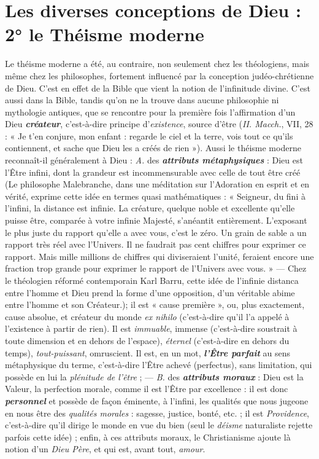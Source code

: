 \section{Les diverses conceptions de Dieu : 2° le Théisme
moderne}%
Le théisme moderne a été, au contraire, non seulement
chez les théologiens, mais même chez les philosophes, fortement
influencé par la {\it }conception judéo-chrétienne de Dieu. C’est en effet
de la Bible que vient la notion de l’\textbf{\textit {}}infinitude divine. C’est aussi
dans la Bible, tandis qu’on ne la trouve dans aucune philosophie ni
mythologie antiques, que se rencontre pour la première fois l’affirmation
d’un Dieu \textbf{\textit {créateur}}, c’est-à-dire principe d’{\it existence}, source
d’être ({\it II. Macch.}, VII, 28 : « Je t’en conjure, mon enfant : regarde
le ciel et la terre, vois tout ce qu’ils contiennent, et sache que Dieu
les a créés de rien »). Aussi le théisme moderne reconnaît-il généralement
à Dieu : {\it A.} des \textbf{\textit {attributs métaphysiques}} : Dieu est l’Être
infini, dont la grandeur est incommensurable avec celle de tout être
créé
{\footnotesize (Le philosophe Malebranche, dans une méditation sur l’Adoration en esprit et en
vérité, exprime cette idée en termes quasi mathématiques : « Seigneur, du fini à l'infini,
la distance est infinie. La créature, quelque noble et excellente qu'elle puisse être, comparée
à votre infinie Majesté, s'anéantit entièrement. L’exposant le plus juste du rapport
qu'elle a avec vous, c’est le zéro. Un grain de sable a un rapport très réel avec l'Univers.
Il ne faudrait pas cent chiffres pour exprimer ce rapport. Mais mille millions de chiffres
qui diviseraient l'unité, feraient encore une fraction trop grande pour exprimer le rapport
de l'Univers avec vous. » — Chez le théologien réformé contemporain Karl Barru,
cette idée de l'infinie distanca entre l’homme et Dieu prend la forme d’une opposition,
d'un véritable abime entre l’homme et son Créateur.)};
il est « cause première », ou, plus exactement, cause absolue,
et créateur du monde {\it ex nihilo} (c’est-à-dire qu’il l’a appelé à l’existence
à partir de rien). Il est {\it immuable}, immense (c’est-à-dire soustrait
à toute dimension et en dehors de l’espace), {\it éternel} (c’est-à-dire
en dehors du temps), {\it tout-puissant}, omruscient. Il est, en un mot,
\textbf{\textit {l'Être parfait}} au sens métaphysique du terme, c’est-à-dire l'Être
achevé (perfectus), sans limitation, qui possède en lui la {\it plénitude
de l'être} ; — {\it B.} des \textbf{\textit {attributs moraux}} : Dieu est {\it }la Valeur, la {\it }perfection
morale, comme il est l’Être par excellence : il est donc \textbf{\textit {personnel}}
et possède de façon éminente, à l’infini, les qualités que nous jugeone
en nous être des {\it qualités morales} : sagesse, justice, bonté, etc. ; il est
{\it Providence}, c’est-à-dire qu’il dirige le monde en vue du bien (seul le
{\it déisme} naturaliste rejette parfois cette idée) ; enfin, à ces attributs
moraux, le Christianisme ajoute là notion d’un {\it Dieu Père}, et qui est,
avant tout, {\it amour}.

